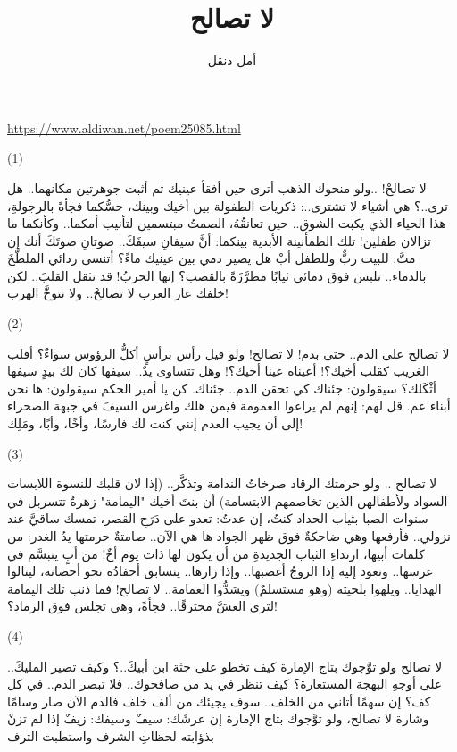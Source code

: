 \documentclass{article}
\title{لا تصالح}
\author{\textarabic{أمل دنقل}}
\date{}
\begin{document}
\centering

\maketitle

\textenglish{\href{https://www.aldiwan.net/poem25085.html}{https://www.aldiwan.net/poem25085.html}}

\begin{modernpoem*}
(1)

لا تصالحْ!
..ولو منحوك الذهب
أترى حين أفقأ عينيك
ثم أثبت جوهرتين مكانهما..
هل ترى..؟
هي أشياء لا تشترى..:
ذكريات الطفولة بين أخيك وبينك،
حسُّكما فجأةً بالرجولةِ،
هذا الحياء الذي يكبت الشوق.. حين تعانقُهُ،
الصمتُ مبتسمين لتأنيب أمكما.. وكأنكما
ما تزالان طفلين!
تلك الطمأنينة الأبدية بينكما:
أنَّ سيفانِ سيفَكَ..
صوتانِ صوتَكَ
أنك إن متَّ:
للبيت ربٌّ
وللطفل أبْ
هل يصير دمي بين عينيك ماءً؟
أتنسى ردائي الملطَّخَ بالدماء..
تلبس فوق دمائي ثيابًا مطرَّزَةً بالقصب؟
إنها الحربُ!
قد تثقل القلبَ..
لكن خلفك عار العرب
لا تصالحْ..
ولا تتوخَّ الهرب!

(2)

لا تصالح على الدم.. حتى بدم!
لا تصالح! ولو قيل رأس برأسٍ
أكلُّ الرؤوس سواءٌ؟
أقلب الغريب كقلب أخيك؟!
أعيناه عينا أخيك؟!
وهل تتساوى يدٌ.. سيفها كان لك
بيدٍ سيفها أثْكَلك؟
سيقولون:
جئناك كي تحقن الدم..
جئناك. كن يا أمير الحكم
سيقولون:
ها نحن أبناء عم.
قل لهم: إنهم لم يراعوا العمومة فيمن هلك
واغرس السيفَ في جبهة الصحراء
إلى أن يجيب العدم
إنني كنت لك
فارسًا،
وأخًا،
وأبًا،
ومَلِك!

(3)

لا تصالح ..
ولو حرمتك الرقاد
صرخاتُ الندامة
وتذكَّر..
(إذا لان قلبك للنسوة اللابسات السواد ولأطفالهن الذين تخاصمهم الابتسامة)
أن بنتَ أخيك "اليمامة"
زهرةٌ تتسربل في سنوات الصبا
بثياب الحداد
كنتُ، إن عدتُ:
تعدو على دَرَجِ القصر،
تمسك ساقيَّ عند نزولي..
فأرفعها وهي ضاحكةٌ
فوق ظهر الجواد
ها هي الآن.. صامتةٌ
حرمتها يدُ الغدر:
من كلمات أبيها،
ارتداءِ الثياب الجديدةِ
من أن يكون لها ذات يوم أخٌ!
من أبٍ يتبسَّم في عرسها..
وتعود إليه إذا الزوجُ أغضبها..
وإذا زارها.. يتسابق أحفادُه نحو أحضانه،
لينالوا الهدايا..
ويلهوا بلحيته (وهو مستسلمٌ)
ويشدُّوا العمامة..
لا تصالح!
فما ذنب تلك اليمامة
لترى العشَّ محترقًا.. فجأةً،
وهي تجلس فوق الرماد؟!

(4)

لا تصالح
ولو توَّجوك بتاج الإمارة
كيف تخطو على جثة ابن أبيكَ..؟
وكيف تصير المليكَ..
على أوجهِ البهجة المستعارة؟
كيف تنظر في يد من صافحوك..
فلا تبصر الدم..
في كل كف؟
إن سهمًا أتاني من الخلف..
سوف يجيئك من ألف خلف
فالدم الآن صار وسامًا وشارة
لا تصالح،
ولو توَّجوك بتاج الإمارة
إن عرشَك: سيفٌ
وسيفك: زيفٌ
إذا لم تزنْ بذؤابته لحظاتِ الشرف
واستطبت الترف


\end{modernpoem*}
\end{document}
